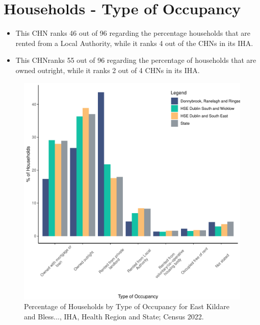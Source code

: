 \documentclass{article}
\begin{document}
\section{Households - Type of Occupancy}\label{sect:Households}
\begin{itemize}
\item This CHN ranks  46 out of 96 regarding the percentage households that are rented from a Local Authority, while it ranks  4 out of the CHNs in its IHA. 
\item This CHNranks  55 out of 96 regarding the percentage of households that are owned outright, while it ranks   2 out of 4 CHNs in its IHA.
\end{itemize}
\begin{figure}[H]
	\centering
	\includegraphics[width = 140mm]{../figures/HouseholdsED.pdf}
	\caption{Percentage of Households by Type of Occupancy for East Kildare and Bless..., IHA, Health Region and State; Census 2022.}
	\label{fig:vbnv}
	\end{figure}
\end{document}
